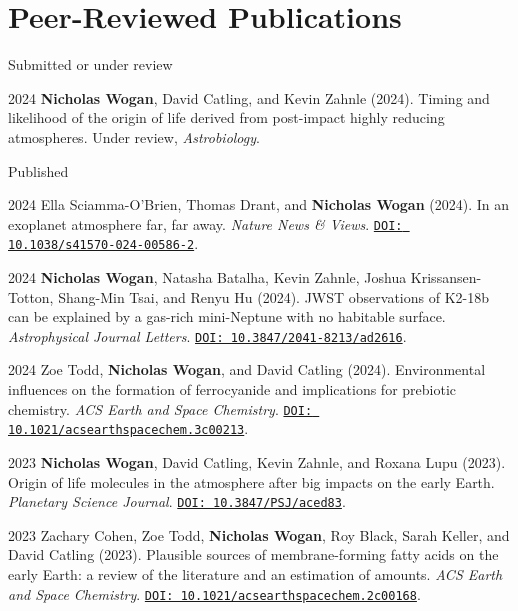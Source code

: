 \documentclass{article}
\begin{document}
\section{Peer-Reviewed Publications}

\noindent Submitted or under review

\begin{cvlist}
\item[2024]
  \textbf{Nicholas Wogan}, David Catling, and Kevin Zahnle (2024). Timing and likelihood of the origin of life derived from post-impact highly reducing atmospheres. Under review, \emph{Astrobiology}.
\end{cvlist}

\noindent Published

\begin{cvlist}
\item[2024]
  Ella Sciamma-O'Brien, Thomas Drant, and \textbf{Nicholas Wogan} (2024). In an exoplanet atmosphere far, far away. \emph{Nature News \& Views}. \href{https://doi.org/10.1038/s41570-024-00586-2}{\nolinkurl{DOI: 10.1038/s41570-024-00586-2}}.
\item[2024]
  \textbf{Nicholas Wogan}, Natasha Batalha, Kevin Zahnle, Joshua Krissansen-Totton, Shang-Min Tsai, and Renyu Hu (2024). JWST observations of K2-18b can be explained by a gas-rich mini-Neptune with no habitable surface. \emph{Astrophysical Journal Letters}. \href{https://doi.org/10.3847/2041-8213/ad2616}{\nolinkurl{DOI: 10.3847/2041-8213/ad2616}}.
\item[2024]
  Zoe Todd, \textbf{Nicholas Wogan}, and David Catling (2024). Environmental influences on the formation of ferrocyanide and implications for prebiotic chemistry. \emph{ACS Earth and Space Chemistry}. \href{https://doi.org/10.1021/acsearthspacechem.3c00213}{\nolinkurl{DOI: 10.1021/acsearthspacechem.3c00213}}.
\item[2023]
  \textbf{Nicholas Wogan}, David Catling, Kevin Zahnle, and Roxana Lupu (2023). Origin of life molecules in the atmosphere after big impacts on the early Earth. \emph{Planetary Science Journal}. \href{https://doi.org/10.3847/PSJ/aced83}{\nolinkurl{DOI: 10.3847/PSJ/aced83}}.
\item[2023]
  Zachary Cohen, Zoe Todd, \textbf{Nicholas Wogan}, Roy Black, Sarah Keller, and David Catling (2023). Plausible sources of membrane-forming fatty acids on the early Earth: a review of the literature and an estimation of amounts. \emph{ACS Earth and Space Chemistry}. \href{https://doi.org/10.1021/acsearthspacechem.2c00168}{\nolinkurl{DOI: 10.1021/acsearthspacechem.2c00168}}.

\end{cvlist}
\end{document}
